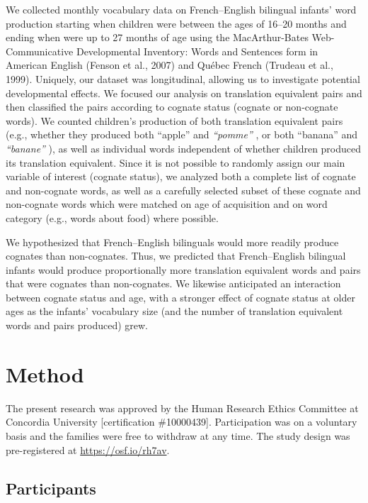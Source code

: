 \documentclass[
  ,man,floatsintext]{apa6}
\begin{document}
We collected monthly vocabulary data on French--English bilingual infants' word production starting when children were between the ages of 16--20 months and ending when were up to 27 months of age using the MacArthur-Bates Web-Communicative Developmental Inventory: Words and Sentences form in American English (Fenson et al., 2007) and Québec French (Trudeau et al., 1999). Uniquely, our dataset was longitudinal, allowing us to investigate potential developmental effects. We focused our analysis on translation equivalent pairs and then classified the pairs according to cognate status (cognate or non-cognate words). We counted children's production of both translation equivalent pairs (e.g., whether they produced both ``apple''  and \emph{``pomme''} , or both ``banana''  and \emph{``banane''} ), as well as individual words independent of whether children produced its translation equivalent. Since it is not possible to randomly assign our main variable of interest (cognate status), we analyzed both a complete list of cognate and non-cognate words, as well as a carefully selected subset of these cognate and non-cognate words which were matched on age of acquisition and on word category (e.g., words about food) where possible.

We hypothesized that French--English bilinguals would more readily produce cognates than non-cognates. Thus, we predicted that French--English bilingual infants would produce proportionally more translation equivalent words and pairs that were cognates than non-cognates. We likewise anticipated an interaction between cognate status and age, with a stronger effect of cognate status at older ages as the infants' vocabulary size (and the number of translation equivalent words and pairs produced) grew.

\hypertarget{method}{%
\section{Method}\label{method}}

The present research was approved by the Human Research Ethics Committee at Concordia University {[}certification \#10000439{]}. Participation was on a voluntary basis and the families were free to withdraw at any time. The study design was pre-registered at \url{https://osf.io/rh7av}.

\hypertarget{participants}{%
\subsection{Participants}\label{participants}}
\end{document}
